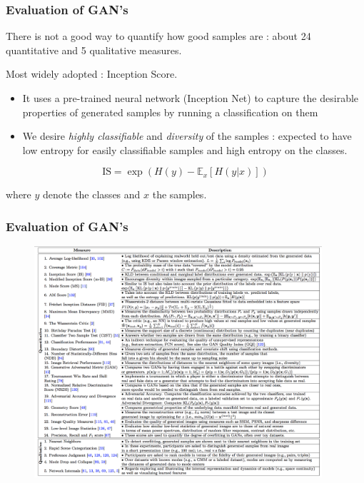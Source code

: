 \documentclass[french,9pt]{beamer}
\begin{document}
\begin{frame}
\frametitle{Evaluation of GAN's}


There is not a good way to quantify how good samples are : about 24 quantitative and 5 qualitative measures.

\pause

Most widely adopted : Inception Score. 
\begin{itemize}
\item It uses a pre-trained neural network (Inception Net) to capture the desirable properties of generated samples by running a classification on them 
\item We desire \emph{highly classifiable} and \emph{diversity} of the samples : expected to have low entropy for easily classifiable samples and high entropy on the classes.
\end{itemize}

\pause

$$\text{IS}=\exp(H(y)-\mathbb{E}_{x}[H(y|x)])$$

 where $y$ denote the classes and $x$ the samples.


\end{frame}

\begin{frame}
\frametitle{Evaluation of GAN's \cite{DBLP:journals/corr/abs-1802-03446}}

\begin{figure}
  \begin{center}
    \includegraphics[width=0.95\textwidth]{fig/evaluation_gan.png}
  \end{center}
\end{figure}
\end{frame}
\end{document}
